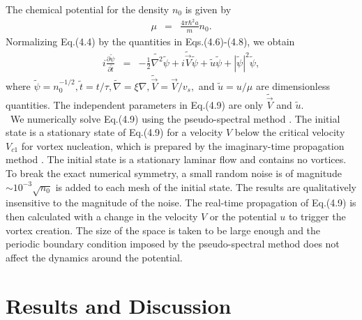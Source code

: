 \documentclass[12pt,a4paper]{report}
\begin{document}
The chemical potential for the density $n_0$ is given by
\begin{eqnarray}
\mu & = & \frac{4 \pi \hbar^2 a}{m} n_0.
\end{eqnarray}
Normalizing Eq.(4.4) by the quantities in Eqs.(4.6)-(4.8), we obtain
\begin{eqnarray}
i \frac{\partial \tilde{\psi}}{\partial \tilde{t}} & = &
- \frac{1}{2} \tilde{\nabla^2} \tilde{\psi}
+ i \tilde{\vec{V}} \tilde{\psi}
+ \tilde{u} \tilde{\psi}
+ | \tilde{\psi} |^2 \tilde{\psi},
\end{eqnarray}
where $\tilde{\psi} = n_0^{-1/2}, \tilde{t} = t/\tau, \tilde{\nabla} = \xi \nabla, \tilde{\vec{V}} = \vec{V}/v_s,$
and $\tilde{u} = u/\mu$ are dimensionless quantities. The independent
parameters in Eq.(4.9) are only $\tilde{\vec{V}}$ and $\tilde{u}$.
\\
\ We numerically solve Eq.(4.9) using the pseudo-spectral method \cite{34}.
The initial state is a stationary state of Eq.(4.9) for a velocity $V$ below the critical velocity $V_{c1}$ for 
vortex nucleation,
which is prepared by the imaginary-time propagation method \cite{55}.
The initial state is a stationary laminar flow and contains no vortices.
To break the exact numerical symmetry,
a small random noise is of magnitude $\sim 10^{-3} \sqrt{n_0}$ is
added to each mesh of the initial state.
The results are qualitatively insensitive to the magnitude of the noise.
The real-time propagation of Eq.(4.9) is
then calculated with a change in the velocity $V$
or the potential $u$ to trigger the 
vortex creation.
The size of the space is taken to be large
enough and the periodic boundary condition imposed by
the pseudo-spectral method does not affect the dynamics
around the potential.
\section{Results and Discussion}
\end{document}
